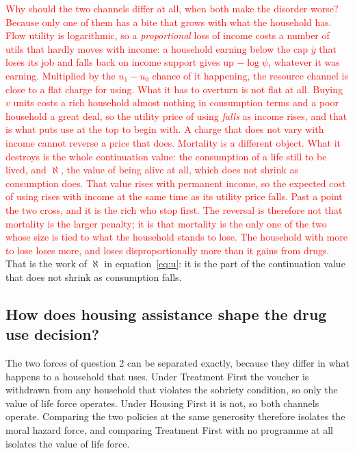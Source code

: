 \documentclass[10pt]{article}
\begin{document}
\textcolor{red}{Why should the two channels differ at all, when both make the disorder
worse? Because only one of them has a bite that grows with what the household
has. Flow utility is logarithmic, so a \emph{proportional} loss of income costs
a number of utils that hardly moves with income: a household earning below the
cap $\bar y$ that loses its job and falls back on income support gives up
$-\log\psi$, whatever it was earning. Multiplied by the $u_1-u_0$ chance of it
happening, the resource channel is close to a flat charge for using. What it has
to overturn is not flat at all. Buying $v$ units costs a rich household almost
nothing in consumption terms and a poor household a great deal, so the utility
price of using \emph{falls} as income rises, and that is what puts use at the top
to begin with. A charge that does not vary with income cannot reverse a price
that does. Mortality is a different object. What it destroys is the whole
continuation value: the consumption of a life still to be lived, and $\aleph$,
the value of being alive at all, which does not shrink as consumption does. That
value rises with permanent income, so the expected cost of using rises with
income at the same time as its utility price falls. Past a point the two cross,
and it is the rich who stop first. The reversal is therefore not that mortality
is the larger penalty; it is that mortality is the only one of the two whose
size is tied to what the household stands to lose. The household with more to
lose loses more, and loses disproportionally more than it gains from drugs.}
That is the work of $\aleph$ in
equation~\eqref{eq:u}: it is the part of the continuation value that does not
shrink as consumption falls.

\subsection{How does housing assistance shape the drug use decision?}\label{sec:mh}

The two forces of question 2 can be separated exactly, because they differ in
what happens to a household that uses. Under Treatment First the voucher is
withdrawn from any household that violates the sobriety condition, so only the
value of life force operates. Under Housing First it is not, so both channels
operate. Comparing the two policies at the same generosity therefore isolates
the moral hazard force, and comparing Treatment First with no programme at all
isolates the value of life force.
\end{document}
